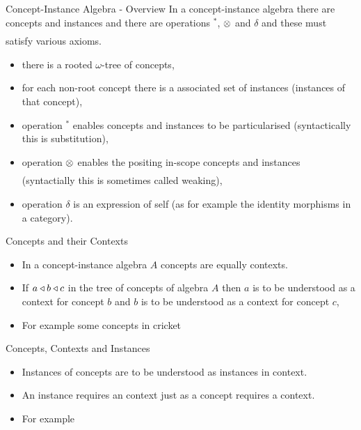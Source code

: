 \begin{frame}{Concept-Instance Algebra -  Overview}
In a concept-instance algebra there are concepts and instances and there are operations $^*$, $\underset{}{\otimes}$ and $\delta$
and these must satisfy various axioms.
\begin{itemize}
\item there is a rooted $\omega$-tree of concepts,
\item for each non-root concept there is a associated set of instances (instances of that concept),
\item operation $^*$ enables  concepts and instances to be particularised (syntactically this is substitution),
\item  operation $\underset{}{\otimes}$ enables the positing in-scope concepts and instances (syntactially this is sometimes called weaking),
\item operation $\delta$ is an expression of self (as for example the identity morphisms in a category).
\end{itemize}
\end{frame}

\begin{frame}{Concepts and their Contexts}
\begin{itemize}
\item In a concept-instance algebra $A$ concepts are equally contexts.
\item If $a \triangleleft b \triangleleft c$ in the tree of concepts of algebra $A$ 
then $a$ is to be understood as a context for concept $b$ and $b$ is to be understood as a context for concept $c$,
\item For example some concepts in cricket

\end{itemize} 
\end{frame}

\begin{frame}{Concepts, Contexts  and Instances}
\begin{itemize}
\item Instances of concepts are to be understood as instances in context.
\item An instance requires an context just as a concept requires a context.
\pause
\item For example 
\end{itemize}
\end{frame}




